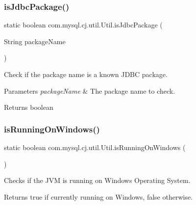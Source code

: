 \subsubsection{\texorpdfstring{is\+Jdbc\+Package()}{isJdbcPackage()}}
{\footnotesize\ttfamily static boolean com.\+mysql.\+cj.\+util.\+Util.\+is\+Jdbc\+Package (\begin{DoxyParamCaption}\item[{String}]{package\+Name }\end{DoxyParamCaption})\hspace{0.3cm}{\ttfamily [static]}}

Check if the package name is a known J\+D\+BC package.


\begin{DoxyParams}{Parameters}
{\em package\+Name} & The package name to check. \\
\hline
\end{DoxyParams}
\begin{DoxyReturn}{Returns}
boolean 
\end{DoxyReturn}
\mbox{\label{classcom_1_1mysql_1_1cj_1_1util_1_1_util_a4e59730a5516d2c70614031e108c51bb}} 
\subsubsection{\texorpdfstring{is\+Running\+On\+Windows()}{isRunningOnWindows()}}
{\footnotesize\ttfamily static boolean com.\+mysql.\+cj.\+util.\+Util.\+is\+Running\+On\+Windows (\begin{DoxyParamCaption}{ }\end{DoxyParamCaption})\hspace{0.3cm}{\ttfamily [static]}}

Checks if the J\+VM is running on Windows Operating System.

\begin{DoxyReturn}{Returns}
{\ttfamily true} if currently running on Windows, {\ttfamily false} otherwise. 
\end{DoxyReturn}
\mbox{\label{classcom_1_1mysql_1_1cj_1_1util_1_1_util_a132de3963fbece2d0e5858f0b420f318}} 
